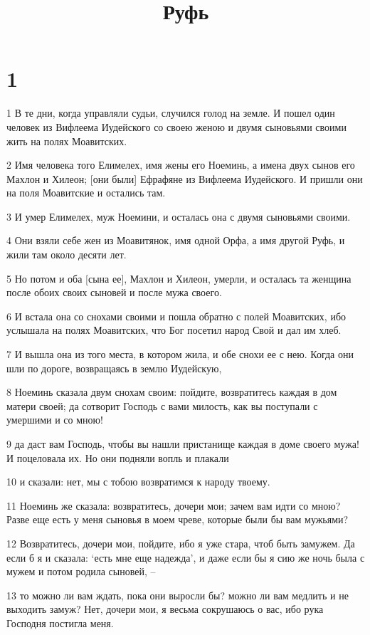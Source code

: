 

\title{Руфь}


\chapter{1}

\par 1 В те дни, когда управляли судьи, случился голод на земле. И пошел один человек из Вифлеема Иудейского со своею женою и двумя сыновьями своими жить на полях Моавитских.
\par 2 Имя человека того Елимелех, имя жены его Ноеминь, а имена двух сынов его Махлон и Хилеон; [они были] Ефрафяне из Вифлеема Иудейского. И пришли они на поля Моавитские и остались там.
\par 3 И умер Елимелех, муж Ноемини, и осталась она с двумя сыновьями своими.
\par 4 Они взяли себе жен из Моавитянок, имя одной Орфа, а имя другой Руфь, и жили там около десяти лет.
\par 5 Но потом и оба [сына ее], Махлон и Хилеон, умерли, и осталась та женщина после обоих своих сыновей и после мужа своего.
\par 6 И встала она со снохами своими и пошла обратно с полей Моавитских, ибо услышала на полях Моавитских, что Бог посетил народ Свой и дал им хлеб.
\par 7 И вышла она из того места, в котором жила, и обе снохи ее с нею. Когда они шли по дороге, возвращаясь в землю Иудейскую,
\par 8 Ноеминь сказала двум снохам своим: пойдите, возвратитесь каждая в дом матери своей; да сотворит Господь с вами милость, как вы поступали с умершими и со мною!
\par 9 да даст вам Господь, чтобы вы нашли пристанище каждая в доме своего мужа! И поцеловала их. Но они подняли вопль и плакали
\par 10 и сказали: нет, мы с тобою возвратимся к народу твоему.
\par 11 Ноеминь же сказала: возвратитесь, дочери мои; зачем вам идти со мною? Разве еще есть у меня сыновья в моем чреве, которые были бы вам мужьями?
\par 12 Возвратитесь, дочери мои, пойдите, ибо я уже стара, чтоб быть замужем. Да если б я и сказала: `есть мне еще надежда', и даже если бы я сию же ночь была с мужем и потом родила сыновей, --
\par 13 то можно ли вам ждать, пока они выросли бы? можно ли вам медлить и не выходить замуж? Нет, дочери мои, я весьма сокрушаюсь о вас, ибо рука Господня постигла меня.
